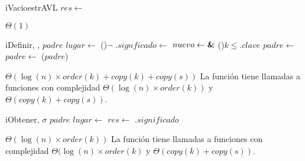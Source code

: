 \begin{Algoritmos}


  \nuevoAlgo
  \begin{algoritmo}{iVacio}{}{estrAVL}
    $res \gets$ \nil{} 
  \end{algoritmo}
  \datosAlgoritmo{} %
  {} %
  {} %
  {$\Theta(1)$} %
  {} %

  \nuevoAlgo
  \begin{algoritmo}{iDefinir}{, , }{}
     $padre$ \;
     $lugar \gets$  
    \eIf(){$\neg$ }{
      .$signficado \gets$  
    }{
       $nuevo \gets \textbf{\&}$   
      \eIf(){$k \leq $$.clave$}{
        $padre \gets$  
      }{
        $padre \gets$  
      }
      \rebalancear($padre$) 
    }
  \end{algoritmo}
  \datosAlgoritmo{} %
  {} %
  {} %
  {$\Theta(\log(n) \times order(k) + copy(k) + copy(s))$} %
  {La funci\'on tiene llamadas a funciones con complejidad $\Theta(\log(n) \times order(k))$ y $\Theta(copy(k) + copy(s))$.} %

  \nuevoAlgo
  \begin{algoritmo}{iObtener}{, }{$\sigma$}
     $padre$ \;
     $lugar \gets$  
    $res \gets$ .$significado$ 
  \end{algoritmo}
  \datosAlgoritmo{} %
  {} %
  {} %
  {$\Theta(\log(n) \times order(k))$} %
  {La funci\'on tiene llamadas a funciones con complejidad $\Theta(\log(n) \times order(k)$ y $\Theta(copy(k) + copy(s))$.} %


\end{Algoritmos}
